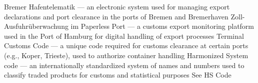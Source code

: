  {Bremer Hafentelematik — an electronic system used for managing export declarations and port clearance in the ports of Bremen and Bremerhaven}
 {Zoll-Ausfuhrüberwachung im Paperless Port — a customs export monitoring platform used in the Port of Hamburg for digital handling of export processes}
 {Terminal Customs Code — a unique code required for customs clearance at certain ports (e.g., Koper, Trieste), used to authorize container handling}
 {Harmonized System code — an internationally standardized system of names and numbers used to classify traded products for customs and statistical purposes}
 {See HS Code}
